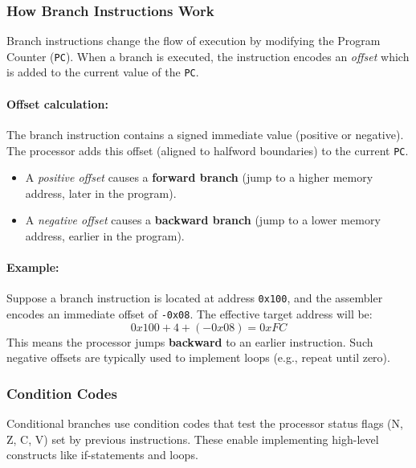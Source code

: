 \subsubsection{How Branch Instructions Work}

Branch instructions change the flow of execution by modifying the Program Counter (\texttt{PC}). 
When a branch is executed, the instruction encodes an \emph{offset} which is added to the current value of the \texttt{PC}.

\paragraph{Offset calculation:}  
The branch instruction contains a signed immediate value (positive or negative).  
The processor adds this offset (aligned to halfword boundaries) to the current \texttt{PC}.  
\begin{itemize}
    \item A \emph{positive offset} causes a \textbf{forward branch} (jump to a higher memory address, later in the program).  
    \item A \emph{negative offset} causes a \textbf{backward branch} (jump to a lower memory address, earlier in the program).  
\end{itemize} 

\paragraph{Example:}  
Suppose a branch instruction is located at address \texttt{0x100}, and the assembler encodes an immediate offset of \texttt{-0x08}.  
The effective target address will be:
\[
0x100 + 4 + (-0x08) = 0xFC
\]
This means the processor jumps \textbf{backward} to an earlier instruction.  
Such negative offsets are typically used to implement loops (e.g., repeat until zero).

\subsubsection{Condition Codes}
Conditional branches use condition codes that test the processor status flags (N, Z, C, V) set by previous instructions. These enable implementing high-level constructs like if-statements and loops.

